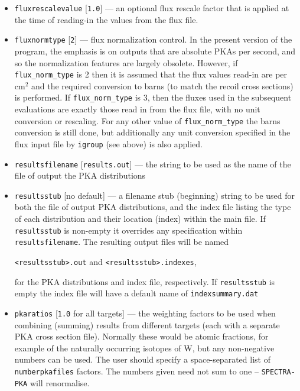 \documentclass[a4paper]{article}
\begin{document}
\begin{itemize}
\item \texttt{flux{\textunderscore}rescale{\textunderscore}value} [\texttt{1.0}] --- an optional flux rescale factor that is applied at the time of reading-in the values from the flux file.

\item \texttt{flux{\textunderscore}norm{\textunderscore}type} [\texttt{2}] --- flux normalization control. In the present version of the program, the emphasis is on outputs that are absolute PKAs per second, and so the normalization features are largely obsolete. However, if \verb|flux_norm_type| is 2 then it is assumed that the flux values read-in are per cm\(^2\) and the required conversion to barns (to match the recoil cross sections) is performed. If \verb|flux_norm_type| is 3, then the fluxes used in the subsequent evaluations are exactly those read in from the flux file, with no unit conversion or rescaling. For any other value of \verb|flux_norm_type| the barns conversion is still done, but additionally any unit conversion specified in the flux input file by \texttt{igroup} (see above) is also applied.
\item \texttt{results{\textunderscore}filename} [\texttt{results.out}] --- the string to be used as the name of the file of output the PKA distributions
\item \texttt{results{\textunderscore}stub} [no default] --- a filename stub (beginning) string to be used for both the file of output PKA distributions, and the index file listing the type of each distribution and their location (index) within the main file. If \texttt{results{\textunderscore}stub} is non-empty it overrides any specification within \texttt{results{\textunderscore}filename}. The resulting output files will be named{\begin{center}\texttt{<results{\textunderscore}stub>.out} and \texttt{<results{\textunderscore}stub>.indexes},\end{center}}for the PKA distributions and index file, respectively. If \texttt{results{\textunderscore}stub} is empty the index file will have a default name of \texttt{index{\textunderscore}summary.dat}
\item \texttt{pka{\textunderscore}ratios} [\texttt{1.0} for all targets] --- the weighting factors to be used when combining (summing) results from different targets (each with a separate PKA cross section file). Normally these would be atomic fractions, for example of the naturally occurring isotopes of W, but any non-negative numbers can be used. The user should specify a space-separated list of \texttt{number{\textunderscore}pka{\textunderscore}files} factors. The numbers given need not sum to one -- \texttt{SPECTRA-PKA} will renormalise.



\end{itemize}
\end{document}
